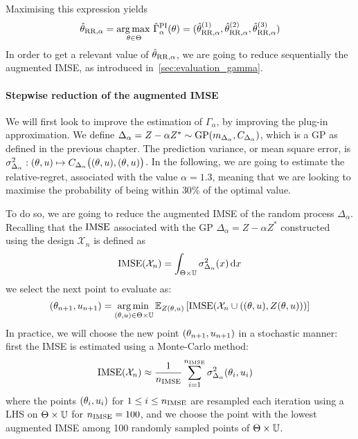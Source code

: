 \documentclass[../../Main_ManuscritThese.tex]{subfiles}
\begin{document}
Maximising this expression yields
\begin{equation}
  \hat{\theta}_{\mathrm{RR},\alpha} = \operatorname*{arg\,max \,}_{\theta\in\Theta} \hat{\Gamma}^{\mathrm{PI}}_{\alpha}(\theta) = (\hat{\theta}^{(1)}_{\mathrm{RR},\alpha}, \hat{\theta}^{(2)}_{\mathrm{RR},\alpha},\hat{\theta}^{(3)}_{\mathrm{RR},\alpha})
\end{equation}
In order to get a relevant value of $\hat{\theta}_{\mathrm{RR},\alpha}$,
we are going to reduce sequentially the augmented IMSE, as introduced
in~\cref{sec:evaluation_gamma}.%
\paragraph{Stepwise reduction of the augmented IMSE}
We will first look to improve the estimation of $\Gamma_{\alpha}$, by
improving the plug-in approximation. We define
$\Delta_{\alpha} = Z - \alpha Z^* \sim \operatorname{\mathrm{GP}}(m_{\Delta_{\alpha}},
C_{\Delta_\alpha})$, which is a GP as defined in the previous chapter.
The prediction variance, or mean square error, is
$\sigma^2_{\Delta_{\alpha}}: (\theta, u) \mapsto
C_{\Delta_{\alpha}}\big((\theta, u), (\theta, u) \big)$. In the
following, we are going to estimate the relative-regret, associated
with the value $\alpha=1.3$, meaning that we are looking to maximise
the probability of being within $30\%$ of the optimal value.


To do so, we are going to reduce the augmented IMSE of the random
process $\Delta_{\alpha}$. Recalling that the $\operatorname{\mathrm{IMSE}}$ associated with
the GP $\Delta_{\alpha}=Z-\alpha Z^*$ constructed using the design
$\mathcal{X}_n$ is defined as
\begin{equation}
  \operatorname{\mathrm{IMSE}}(\mathcal{X}_n) = \int_{\Theta \times \mathbb{U}} \sigma^2_{\Delta_{\alpha}}(x) \,\mathrm{d}x
\end{equation}
we select the next point to evaluate as:
\begin{equation}
  (\theta_{n+1}, u_{n+1}) = \operatorname*{arg\,min \,}_{(\theta,u)\in\Theta\times \mathbb{U}} \mathbb{E}_{Z(\theta, u)}\left[\operatorname{\mathrm{IMSE}}(\mathcal{X}_n \cup \left((\theta, u), Z(\theta, u)\right))\right]
\end{equation}
In practice, we will choose the new point $(\theta_{n+1}, u_{n+1})$ in
a stochastic manner: first the IMSE is estimated using a Monte-Carlo
method:
\begin{align}
  \IMSE(\mathcal{X}_n) %
                       &\approx \frac{1}{n_{\IMSE}} \sum_{i=1}^{n_{\IMSE}} \sigma_{\Delta_{\alpha}}^2(\kk_i, \uu_i)
\end{align}
where the points $(\theta_i, u_i)$ for $1\leq i \leq n_{\operatorname{\mathrm{IMSE}}}$ are
resampled each iteration using a LHS on $\Theta \times \mathbb{U}$ for
$n_{\operatorname{\mathrm{IMSE}}}=100$, and we choose the point with the lowest augmented
IMSE among \num{100} randomly sampled points of
$\Theta\times\mathbb{U}$.
\end{document}
